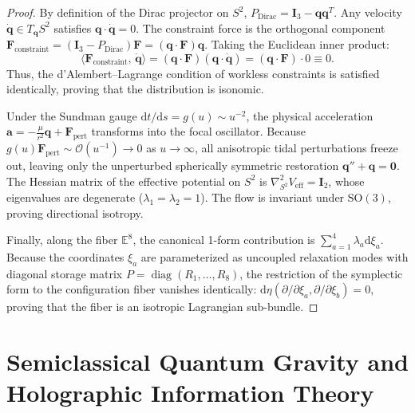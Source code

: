 \documentclass[11pt,a4paper,reqno]{article}
\theoremstyle{plain}
\theoremstyle{definition}
\theoremstyle{remark}
\numberwithin{equation}{section}
\numberwithin{table}{section}
\providecommand{\diff}{\mathrm{d}}
\begin{document}
\begin{proof}
By definition of the Dirac projector on $S^2$, $P_{\mathrm{Dirac}} = \bm{I}_3 - \bm{q}\bm{q}^T$. Any velocity $\dot{\bm{q}} \in T_{\bm{q}} S^2$ satisfies $\bm{q} \cdot \dot{\bm{q}} = 0$. The constraint force is the orthogonal component $\bm{F}_{\mathrm{constraint}} = (\bm{I}_3 - P_{\mathrm{Dirac}})\bm{F} = (\bm{q} \cdot \bm{F})\bm{q}$. Taking the Euclidean inner product:
\begin{equation}
  \langle \bm{F}_{\mathrm{constraint}}, \, \dot{\bm{q}} \rangle = (\bm{q} \cdot \bm{F})(\bm{q} \cdot \dot{\bm{q}}) = (\bm{q} \cdot \bm{F}) \cdot 0 \equiv 0.
\end{equation}
Thus, the d'Alembert--Lagrange condition of workless constraints is satisfied identically, proving that the distribution is isonomic. 

Under the Sundman gauge $\diff t / \diff s = g(u) \sim u^{-2}$, the physical acceleration $\bm{a} = -\frac{\mu}{r^2}\bm{q} + \bm{F}_{\mathrm{pert}}$ transforms into the focal oscillator. Because $g(u)\bm{F}_{\mathrm{pert}} \sim \mathcal{O}(u^{-1}) \to 0$ as $u \to \infty$, all anisotropic tidal perturbations freeze out, leaving only the unperturbed spherically symmetric restoration $\bm{q}'' + \bm{q} = \bm{0}$. The Hessian matrix of the effective potential on $S^2$ is $\nabla_{S^2}^2 V_{\mathrm{eff}} = \bm{I}_2$, whose eigenvalues are degenerate ($\lambda_1 = \lambda_2 = 1$). The flow is invariant under $\mathrm{SO}(3)$, proving directional isotropy.

Finally, along the fiber $\mathbb{E}^8$, the canonical 1-form contribution is $\sum_{a=1}^4 \lambda_a \diff\xi_a$. Because the coordinates $\xi_a$ are parameterized as uncoupled relaxation modes with diagonal storage matrix $P = \operatorname{diag}(R_1, \dots, R_8)$, the restriction of the symplectic form to the configuration fiber vanishes identically: $\diff\eta(\partial/\partial\xi_a, \partial/\partial\xi_b) = 0$, proving that the fiber is an isotropic Lagrangian sub-bundle.
\end{proof}

\section{Semiclassical Quantum Gravity and Holographic Information Theory}
\label{sec:semiclassical_quantum_gravity}
\end{document}
